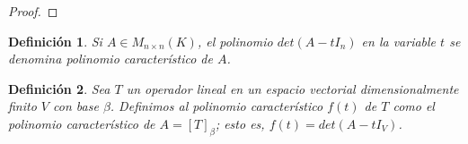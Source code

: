 \documentclass{book}
\newtheorem{definition}{Definición}
\begin{document}
\begin{proof}

\end{proof}

\begin{definition}
Si $A\in M_{n\times n}(K)$, el polinomio $det(A-t I_{n})$ en la variable $t$ se denomina polinomio característico de $A$.
\end{definition}

\begin{definition}
Sea $T$ un operador lineal en un espacio vectorial dimensionalmente finito $V$ con base $\beta$. Definimos al polinomio característico $f(t)$ de $T$ como el polinomio característico de $A=[T]_{\beta}$; esto es, $f(t)=det(A-t I_{V})$.
\end{definition}
\end{document}
